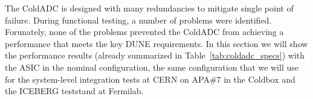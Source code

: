 \label{sec:4.}


The ColdADC is designed with many redundancies to mitigate single point of failure. During functional testing, a number of 
problems were identified. Forunately, none of the problems prevented the ColdADC from achieving a performance that meets 
the key DUNE requirements. In this section we will show the performance results (already summarized 
in Table~\ref{tab:coldadc_specs}) with the ASIC in the nominal configuration, the same configuration that we will 
use for the system-level integration tests at CERN on APA\#7 in the Coldbox and the ICEBERG teststand at Fermilab.
